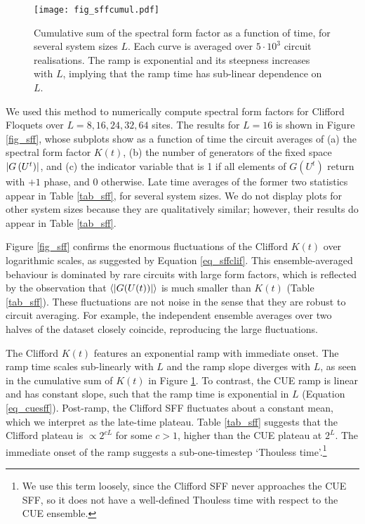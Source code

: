 \documentclass[10pt]{article}
\begin{document}
\begin{figure}
\centering
\texttt{[image: fig\_sffcumul.pdf]}
\caption{Cumulative sum of the spectral form factor as a function of time, for several system sizes $L$. Each curve is averaged over $5\cdot10^3$ circuit realisations. The ramp is exponential and its steepness increases with $L$, implying that the ramp time has sub-linear dependence on $L$.}
\label{fig_sffcumul}
\end{figure}

We used this method to numerically compute spectral form factors for Clifford Floquets over $L=8,16,24,32,64$ sites. The results for $L=16$ is shown in Figure \ref{fig_sff}, whose subplots show as a function of time the circuit averages of (a) the spectral form factor $K(t)$, (b) the number of generators of the fixed space $\abs{G\left(U^t\right)}$, and (c) the indicator variable that is 1 if all elements of $G\left(U^t\right)$ return with $+1$ phase, and 0 otherwise. Late time averages of the former two statistics appear in Table \ref{tab_sff}, for several system sizes. We do not display plots for other system sizes because they are qualitatively similar; however, their results do appear in Table \ref{tab_sff}.

Figure \ref{fig_sff} confirms the enormous fluctuations of the Clifford $K(t)$ over logarithmic scales, as suggested by Equation \ref{eq_sffclif}. This ensemble-averaged behaviour is dominated by rare circuits with large form factors, which is reflected by the observation that $\ev{\abs{G(U(t))}}$ is much smaller than $K(t)$ (Table \ref{tab_sff}). These fluctuations are not noise in the sense that they are robust to circuit averaging. For example, the independent ensemble averages over two halves of the dataset closely coincide, reproducing the large fluctuations.


The Clifford $K(t)$ features an exponential ramp with immediate onset. The ramp time scales sub-linearly with $L$ and the ramp slope diverges with $L$, as seen in the cumulative sum of $K(t)$ in Figure \ref{fig_sffcumul}. To contrast, the CUE ramp is linear and has constant slope, such that the ramp time is exponential in $L$ (Equation \ref{eq_cuesff}). Post-ramp, the Clifford SFF fluctuates about a constant mean, which we interpret as the late-time plateau. Table \ref{tab_sff} suggests that the Clifford plateau is $\propto 2^{cL}$ for some $c>1$, higher than the CUE plateau at $2^L$. The immediate onset of the ramp suggests a sub-one-timestep `Thouless time'.\footnote{We use this term loosely, since the Clifford SFF never approaches the CUE SFF, so it does not have a well-defined Thouless time with respect to the CUE ensemble.}
\end{document}
